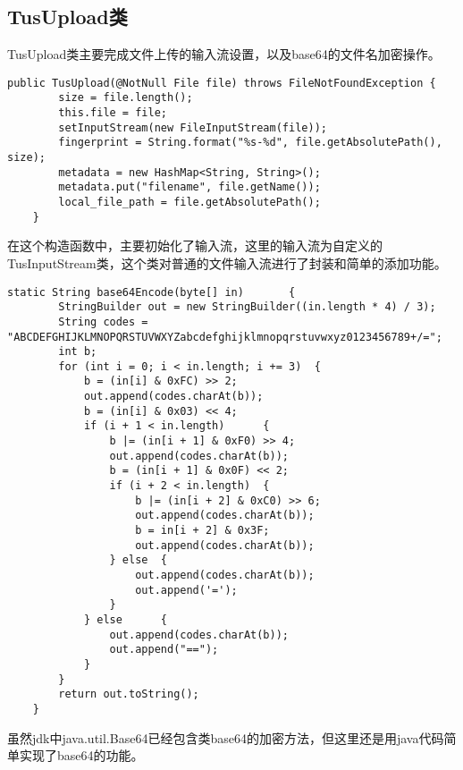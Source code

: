 \documentclass[bachelor]{thesis-uestc}
\begin{document}
\subsection{TusUpload类}
TusUpload类主要完成文件上传的输入流设置，以及base64的文件名加密操作。
\begin{lstlisting}[title=TusUpload类构造函数]
public TusUpload(@NotNull File file) throws FileNotFoundException {
        size = file.length();
        this.file = file;
        setInputStream(new FileInputStream(file));
        fingerprint = String.format("%s-%d", file.getAbsolutePath(), size);
        metadata = new HashMap<String, String>();
        metadata.put("filename", file.getName());
        local_file_path = file.getAbsolutePath();
    }
\end{lstlisting}
\par 在这个构造函数中，主要初始化了输入流，这里的输入流为自定义的TusInputStream类，这个类对普通的文件输入流进行了封装和简单的添加功能。
\begin{lstlisting}[title=base64加密函数]
static String base64Encode(byte[] in)       {
        StringBuilder out = new StringBuilder((in.length * 4) / 3);
        String codes = "ABCDEFGHIJKLMNOPQRSTUVWXYZabcdefghijklmnopqrstuvwxyz0123456789+/=";
        int b;
        for (int i = 0; i < in.length; i += 3)  {
            b = (in[i] & 0xFC) >> 2;
            out.append(codes.charAt(b));
            b = (in[i] & 0x03) << 4;
            if (i + 1 < in.length)      {
                b |= (in[i + 1] & 0xF0) >> 4;
                out.append(codes.charAt(b));
                b = (in[i + 1] & 0x0F) << 2;
                if (i + 2 < in.length)  {
                    b |= (in[i + 2] & 0xC0) >> 6;
                    out.append(codes.charAt(b));
                    b = in[i + 2] & 0x3F;
                    out.append(codes.charAt(b));
                } else  {
                    out.append(codes.charAt(b));
                    out.append('=');
                }
            } else      {
                out.append(codes.charAt(b));
                out.append("==");
            }
        }
        return out.toString();
    }
\end{lstlisting}
虽然jdk中java.util.Base64已经包含类base64的加密方法，但这里还是用java代码简单实现了base64的功能。
\end{document}

